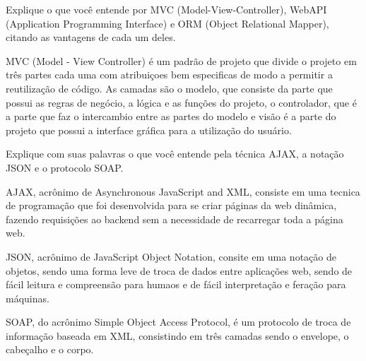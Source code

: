 \documentclass[a4 paper]{article}
\begin{document}




\vspace{5mm}

 Explique o que você entende por MVC (Model-View-Controller), WebAPI (Application Programming Interface) e
ORM (Object Relational Mapper), citando as vantagens de cada um deles.


MVC (Model - View Controller) é um padrão de projeto que divide o projeto em três partes cada uma com atribuiçoes bem especificas de modo a permitir a reutilização de código. As camadas são o modelo, que consiste da parte que possui as regras de negócio, a lógica e as funções do projeto, o controlador, que é a parte que faz o intercambio entre as partes do modelo e visão é a parte do projeto que possui a interface gráfica para a utilização do usuário. 

\vspace{5mm}

Explique com suas palavras o que você entende pela técnica AJAX, a notação JSON e o protocolo SOAP.

AJAX, acrônimo de Asynchronous JavaScript and XML, consiste em uma tecnica de programação que foi desenvolvida para se criar páginas da web dinâmica, fazendo requisições ao backend sem a necessidade de recarregar toda a página web.

JSON, acrônimo de JavaScript Object Notation, consite em uma notação de objetos, sendo uma forma leve de troca de dados entre aplicações web, sendo de fácil leitura e compreensão para humaos e de fácil interpretação e feração para máquinas.

SOAP, do acrônimo Simple Object Access Protocol, é um protocolo de troca de informação baseada em XML, consistindo em três camadas sendo o envelope, o cabeçalho e o corpo. 

\vspace{5mm}
\end{document}
